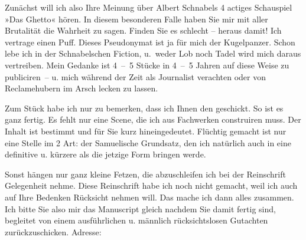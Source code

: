 \pstart
           Zunächst will ich also Ihre Meinung über Albert Schnabels 4 actiges Schauspiel »Das Ghetto« hören. In diesem besonderen Falle
               haben Sie mir mit aller Brutalität die Wahrheit zu sagen. Finden Sie es schlecht –
               heraus damit! Ich vertrage einen Puff. Dieses Pseudonymat ist ja für mich der
               Kugelpanzer. Schon lebe ich in der Schnabelschen Fiction, u. weder Lob noch Tadel
               wird mich daraus vertreiben. Mein Gedanke ist 4 – 5 Stücke in 4 – 5 Jahren auf diese
               Weise zu publiciren – u. mich während der Zeit als Journalist verachten oder von
               Reclamehubern im Arsch lecken zu lassen.\pend
           
\pstart
           Zum Stück habe ich nur zu
               bemerken, dass ich Ihnen den \label{K_L03836-4v}\label{K_L03836-4}{ }geschickt. So ist es ganz fertig. Es fehlt nur eine Scene, die ich aus Fachwerken
               construiren muss. Der Inhalt ist bestimmt und für Sie kurz hineingedeutet. Flüchtig
               gemacht ist nur eine Stelle im 2 Art: der Samuelische Grundsatz, den ich natürlich
               auch in eine definitive u. kürzere als die jetzige Form bringen werde.\pend
           
\pstart
           Sonst hängen nur ganz kleine Fetzen, die abzuschleifen ich bei der Reinschrift Gelegenheit nehme. Diese Reinschrift habe ich noch nicht
               gemacht, weil ich auch auf Ihre Bedenken Rücksicht nehmen will. Das mache {\pb}ich dann alles zusammen. Ich bitte Sie
               also mir das Manuscript gleich
               nachdem Sie damit fertig sind, begleitet von einem ausführlichen u. männlich
               rücksichtslosen Gutachten zurückzuschicken. Adresse:\pend
           
